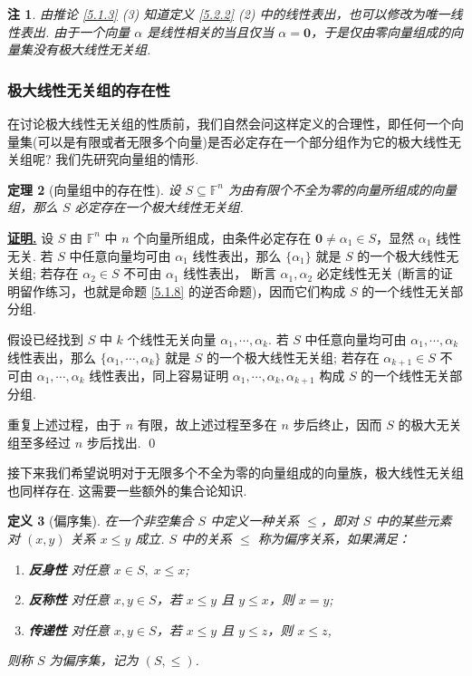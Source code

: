 \documentclass[10pt,openany]{article}
\theoremstyle{thmstyle} %
\newtheorem{theorem}{定理}[subsection]
\theoremstyle{defstyle} %
\newtheorem{definition}[theorem]{定义}
\theoremstyle{prostyle} %
\theoremstyle{exastyle}
\theoremstyle{remstyle}
\newtheorem{remark}[theorem]{注}
\renewenvironment{proof}[1][证明]{\par\underline{\textbf{#1.}} \;\fangsong}{\qed\par}
\newcommand{\F}{\mathbb{F}}
\begin{document}
\begin{remark}
	由推论 \ref{5.1.3} (3) 知道定义 \ref{5.2.2} (2) 中的线性表出，也可以修改为{\color{red}唯一}线性表出. 由于一个向量 \( \alpha \) 是线性相关的当且仅当 \( \alpha=\bm{0} \)，于是仅由零向量组成的向量集没有极大线性无关组.
\end{remark}

\subsubsection{极大线性无关组的存在性}

在讨论极大线性无关组的性质前，我们自然会问这样定义的合理性，即任何一个向量集(可以是有限或者无限多个向量)是否必定存在一个部分组作为它的极大线性无关组呢? 我们先研究向量组的情形.

\begin{theorem}[向量组中的存在性]
	设 \( S \subseteq \F^n \) 为由有限个不全为零的向量所组成的向量组，那么 \( S \) 必定存在一个极大线性无关组.
\end{theorem}

\begin{proof}
	设 \( S \) 由 \( \F^n \) 中 \( n \) 个向量所组成，由条件必定存在 \( \bm{0} \neq \alpha_1 \in S \)，显然 \( \alpha_1 \) 线性无关. 若 \( S \) 中任意向量均可由 \( \alpha_1 \) 线性表出，那么 \( \{\alpha_1\} \) 就是 \( S \) 的一个极大线性无关组; 若存在 \( \alpha_2 \in S \) 不可由 \( \alpha_1 \) 线性表出，{\color{blue} 断言 \( \alpha_1,\alpha_2 \) 必定线性无关 (断言的证明留作练习，也就是命题 \ref{5.1.8} 的逆否命题)}，因而它们构成 \( S \) 的一个线性无关部分组.
	
	假设已经找到 \( S \) 中 \( k \) 个线性无关向量 \( \alpha_1,\cdots,\alpha_k \). 若 \( S \) 中任意向量均可由 \( \alpha_1,\cdots,\alpha_k  \) 线性表出，那么 \( \{\alpha_1,\cdots,\alpha_k \} \) 就是 \( S \) 的一个极大线性无关组; 若存在 \( \alpha_{k+1} \in S \) 不可由 \( \alpha_1,\cdots,\alpha_k  \) 线性表出，同上容易证明 \( \alpha_1,\cdots,\alpha_k,\alpha_{k+1} \) 构成 \( S \) 的一个线性无关部分组.
	
	重复上述过程，由于 \( n \) 有限，故上述过程至多在 \( n \) 步后终止，因而 \( S \) 的极大无关组至多经过 \( n \) 步后找出.
\end{proof}


接下来我们希望说明对于无限多个不全为零的向量组成的向量族，极大线性无关组也同样存在. 这需要一些额外的集合论知识.

\begin{definition}[偏序集]
	在一个非空集合 \( S \) 中定义一种关系 \( \leq \)，即对 \( S \) 中的某些元素对 \( (x,y) \) 关系 \( x \leq y \) 成立. \( S \) 中的关系 \( \leq \) 称为偏序关系，如果满足：
	\begin{enumerate}[(1)]
		\item \textbf{反身性} \; 对任意 \( x \in S, \; x \leq x \);
		\item \textbf{反称性} \; 对任意 \( x, y \in S \)，若 \( x \leq y \) 且 \( y \leq x \)，则 \( x=y \);
		\item \textbf{传递性} \; 对任意 \( x, y \in S \)，若 \( x \leq y \) 且 \( y \leq z \)，则 \( x \leq z \),
	\end{enumerate}
	
	则称 \( S \) 为偏序集，记为 \( (S,\leq) \).
\end{definition}
\end{document}
